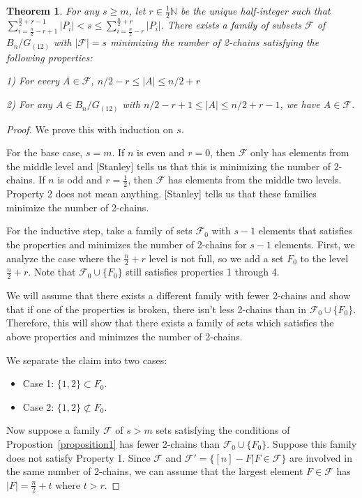 \documentclass[12pt]{article}
\theoremstyle{plain}
\newtheorem{theorem}{Theorem}
\theoremstyle{definition}
\theoremstyle{remark}
\newcommand{\F}{\mathcal{F}}
\begin{document}
\begin{theorem} For any $s \geq m$, let $r \in \frac{1}{2}\mathbb{N}$ be the unique half-integer such that $\sum_{i = \frac{n}{2} - r +1}^{\frac{n}{2} + r -1} |P_i| < s \leq \sum_{i = \frac{n}{2}-r}^{\frac{n}{2}+r}|P_i|$. There exists a family of subsets $\F$ of $B_n / G_{(12)}$ with $|\F| = s$ minimizing the number of 2-chains satisfying the following properties:

1) For every $A \in \F$, $n/2 - r \leq |A| \leq n/2 + r$

2) For any $A \in B_n / G_{(12)}$ with $n/2 - r + 1 \leq |A| \leq n/2 + r - 1$, we have $A \in \F$.
\end{theorem}

\begin{proof}
We prove this with induction on $s$.

For the base case, $s = m$. If $n$ is even and $r = 0$, then $\F$ only has elements from the middle level and [Stanley] tells us that this is minimizing the number of 2-chains. If $n$ is odd and $r = \frac{1}{2}$, then $\F$ has elements from the middle two levels. Property 2 does not mean anything. [Stanley] tells us that these families minimize the number of 2-chains. 

For the inductive step, take a family of sets $\F_0$ with $s-1$ elements that satisfies the properties and minimizes the number of 2-chains for $s-1$ elements. First, we analyze the case where the $\frac{n}{2}+r$ level is not full, so we add a set $F_0$ to the level $\frac{n}{2} + r$. Note that $\F_0 \cup \{F_0\}$ still satisfies properties 1 through 4.

We will assume that there exists a different family with fewer 2-chains and show that if one of the properties is broken, there isn't less 2-chains than in $\F_0 \cup \{ F_0\}$. Therefore, this will show that there exists a family of sets which satisfies the above properties and minimzes the number of 2-chains.

We separate the claim into two cases:

\begin{itemize}
\item Case 1: $\{1, 2\} \subset F_0$.
\item Case 2: $\{ 1, 2\} \not\subset F_0$.
\end{itemize}

Now suppose a family $\F$ of $s > m$ sets satisfying the conditions of Propostion~\ref{proposition1} has fewer 2-chains than $\F_0 \cup \{F_0\}$. Suppose this family does not satisfy Property 1. Since $\F$ and $\F' = \{ [n] - F | F \in \F \}$ are involved in the same number of 2-chains, we can assume that the largest element $F \in \F$ has $|F| = \frac{n}{2} + t$ where $t > r$. 


\end{proof}
\end{document}
